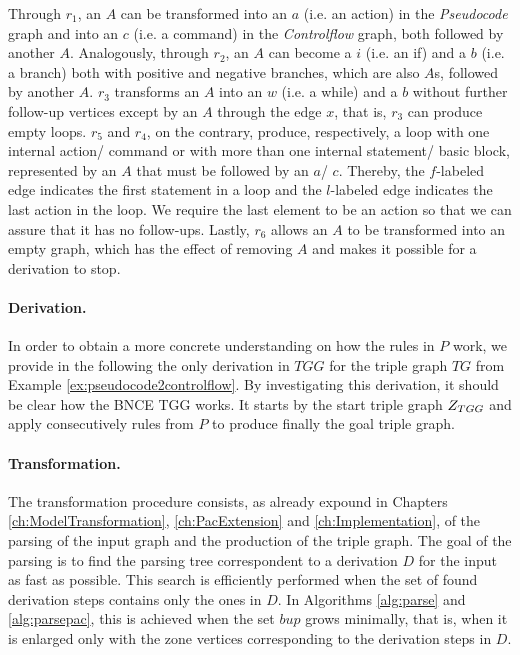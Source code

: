 Through $r_1$, an $A$ can be transformed into an $a$ (i.e. an action) in the \emph{Pseudocode} graph and into an $c$ (i.e. a command) in the \emph{Controlflow} graph, both followed by another $A$. Analogously, through $r_2$, an $A$ can become a $i$ (i.e. an if) and a $b$ (i.e. a branch) both with positive and negative branches, which are also $A$s, followed by another $A$. $r_3$ transforms an $A$ into an $w$ (i.e. a while) and a $b$ without further follow-up vertices except by an $A$ through the edge $x$, that is, $r_3$ can produce empty loops. $r_5$ and $r_4$, on the contrary, produce, respectively, a loop with one internal action/ command or with more than one internal statement/ basic block, represented by an $A$ that must be followed by an $a$/ $c$. Thereby, the $f$-labeled edge indicates the first statement in a loop and the $l$-labeled edge indicates the last action in the loop. We require the last element to be an action so that we can assure that it has no follow-ups. Lastly, $r_6$ allows an $A$ to be transformed into an empty graph, which has the effect of removing $A$ and makes it possible for a derivation to stop.

\paragraph*{Derivation. } In order to obtain a more concrete understanding on how the rules in $P$ work, we provide in the following the only derivation in $TGG$ for the triple graph $TG$ from Example \ref{ex:pseudocode2controlflow}. By investigating this derivation, it should be clear how the BNCE TGG works. It starts by the start triple graph $Z_{TGG}$ and apply consecutively rules from $P$ to produce finally the goal triple graph.



\paragraph*{Transformation. } The transformation procedure consists, as already expound in Chapters \ref{ch:ModelTransformation}, \ref{ch:PacExtension} and \ref{ch:Implementation}, of the parsing of the input graph and the production of the triple graph. The goal of the parsing is to find the parsing tree correspondent to a derivation $D$ for the input as fast as possible. This search is efficiently performed when the set of found derivation steps contains only the ones in $D$. In Algorithms \ref{alg:parse} and \ref{alg:parsepac}, this is achieved when the set $bup$ grows minimally, that is, when it is enlarged only with the zone vertices corresponding to the derivation steps in $D$.

